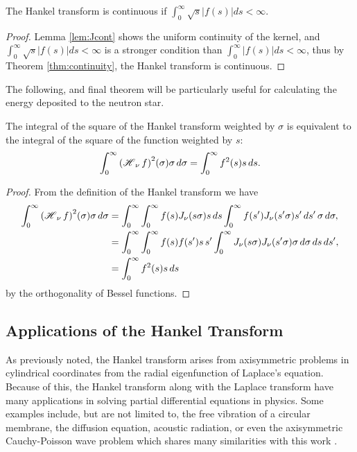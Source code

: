 \begin{theorem}
The Hankel transform is continuous if $\int_0^\infty \sqrt{s}|f(s)| ds < \infty$.
\end{theorem}
\begin{proof}
Lemma \ref{lem:Jcont} shows the uniform continuity of the kernel, and $\int_0^\infty \sqrt{s}|f(s)| ds < \infty$ is a stronger condition than $\int_0^\infty |f(s)| ds < \infty$, thus by Theorem \ref{thm:continuity}, the Hankel transform is continuous.
\end{proof}

The following, and final theorem will be particularly useful for calculating the energy deposited to the neutron star.
\begin{theorem}
\label{thm:square}
The integral of the square of the Hankel transform weighted by $\sigma$ is equivalent to the integral of the square of the function weighted by $s$:
\begin{align*}
\int_0^\infty \Hank[\nu]{f}^2(\sigma) \sigma \, d\sigma = \int_0^\infty f^2(s)s \, ds.
\end{align*}
\end{theorem}

\begin{proof}
From the definition of the Hankel transform we have
\begin{align*}
\int_0^\infty \Hank[\nu]{f}^2(\sigma) \sigma \, d\sigma &= \int_0^\infty \int_0^\infty f(s) J_\nu(s \sigma) s \, ds \int_0^\infty f(s') J_\nu(s' \sigma) s' \, ds' \, \sigma \, d\sigma, \\
&= \int_0^\infty \int_0^\infty f(s) f(s') s \, s' \int_0^\infty J_\nu(s \sigma) J_\nu(s' \sigma) \sigma \, d\sigma \, ds \, ds', \\
&= \int_0^\infty f^2(s) s \, ds
\end{align*}
by the orthogonality of Bessel functions.
\end{proof}

\subsection{Applications of the Hankel Transform}

As previously noted, the Hankel transform arises from axisymmetric problems in cylindrical coordinates from the radial eigenfunction of Laplace's equation. Because of this, the Hankel transform along with the Laplace transform have many applications in solving partial differential equations in physics. Some examples include, but are not limited to, the free vibration of a circular membrane, the diffusion equation, acoustic radiation, or even the axisymmetric Cauchy-Poisson wave problem which shares many similarities with this work \cite{transforms}.

%
